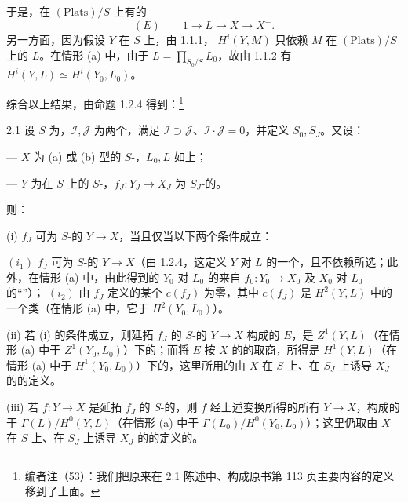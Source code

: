 于是，在 $(\mathrm{Plats})/S$ 上有的
\[
 (E)\qquad 1\longrightarrow L\longrightarrow X\longrightarrow X^+.
\]
另一方面，因为假设 $Y$ 在 $S$ 上，由 1.1.1， $H^i(Y,M)$ 只依赖 $M$ 在 $(\mathrm{Plats})/S$ 上的 $L$。在情形 (a) 中，由于 $L=\prod_{S_0/S}L_0$，故由 1.1.2 有 $H^i(Y,L)\simeq H^i(Y_0,L_0)$。

综合以上结果，由命题 1.2.4 得到：\footnote{编者注（53）：我们把原来在 2.1 陈述中、构成原书第 113 页主要内容的定义移到了上面。}
\begin{SGAresult}{}{2.1}
设 $S$ 为，$\mathcal I,\mathcal J$ 为两个，满足 $\mathcal I\supset\mathcal J$、$\mathcal I\cdot\mathcal J=0$，并定义 $S_0,S_J$。又设：

--- $X$ 为 (a) 或 (b) 型的 $S$-，$L_0,L$ 如上；

--- $Y$ 为在 $S$ 上的 $S$-，$f_J:Y_J\to X_J$ 为 $S_J$-的。

则：

(i) $f_J$ 可为 $S$-的 $Y\to X$，当且仅当以下两个条件成立：

$(i_1)$ $f_J$ 可为 $S$-的 $Y\to X$（由 1.2.4，这定义 $Y$ 对 $L$ 的一个，且不依赖所选；此外，在情形 (a) 中，由此得到的 $Y_0$ 对 $L_0$ 的来自 $f_0:Y_0\to X_0$ 及 $X_0$ 对 $L_0$ 的“”）；
$(i_2)$ 由 $f_J$ 定义的某个 $c(f_J)$ 为零，其中 $c(f_J)$ 是 $H^2(Y,L)$ 中的一个类（在情形 (a) 中，它于 $H^2(Y_0,L_0)$）。

(ii) 若 (i) 的条件成立，则延拓 $f_J$ 的 $S$-的 $Y\to X$ 构成的 $E$，是 $Z^1(Y,L)$（在情形 (a) 中于 $Z^1(Y_0,L_0)$）下的；而将 $E$ 按 $X$ 的的取商，所得是 $H^1(Y,L)$（在情形 (a) 中于 $H^1(Y_0,L_0)$）下的，这里所用的由 $X$ 在 $S$ 上、在 $S_J$ 上诱导 $X_J$ 的的定义。

(iii) 若 $f:Y\to X$ 是延拓 $f_J$ 的 $S$-的，则 $f$ 经上述变换所得的所有 $Y\to X$，构成的于 $\Gamma(L)/H^0(Y,L)$（在情形 (a) 中于 $\Gamma(L_0)/H^0(Y_0,L_0)$）；这里仍取由 $X$ 在 $S$ 上、在 $S_J$ 上诱导 $X_J$ 的的定义的。
\end{SGAresult}
